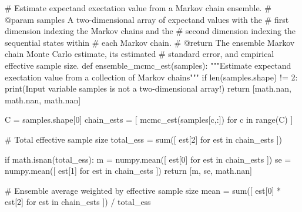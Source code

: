 \documentclass[
  letterpaper,
  DIV=11,
  numbers=noendperiod]{scrartcl}
\newenvironment{Shaded}{\begin{snugshade}}{\end{snugshade}}
\newcommand{\BuiltInTok}[1]{\textcolor[rgb]{0.00,0.23,0.31}{#1}}
\newcommand{\CommentTok}[1]{\textcolor[rgb]{0.37,0.37,0.37}{#1}}
\newcommand{\ControlFlowTok}[1]{\textcolor[rgb]{0.00,0.23,0.31}{#1}}
\newcommand{\DecValTok}[1]{\textcolor[rgb]{0.68,0.00,0.00}{#1}}
\newcommand{\KeywordTok}[1]{\textcolor[rgb]{0.00,0.23,0.31}{#1}}
\newcommand{\NormalTok}[1]{\textcolor[rgb]{0.00,0.23,0.31}{#1}}
\newcommand{\OperatorTok}[1]{\textcolor[rgb]{0.37,0.37,0.37}{#1}}
\newcommand{\StringTok}[1]{\textcolor[rgb]{0.13,0.47,0.30}{#1}}
\begin{document}
\begin{Shaded}
\begin{Highlighting}[]
\CommentTok{\# Estimate expectand exectation value from a Markov chain ensemble.}
\CommentTok{\# @param samples A two{-}dimensional array of expectand values with the}
\CommentTok{\#                first dimension indexing the Markov chains and the}
\CommentTok{\#                second dimension indexing the sequential states within}
\CommentTok{\#                each Markov chain.}
\CommentTok{\# @return The ensemble Markov chain Monte Carlo estimate, its estimated}
\CommentTok{\#         standard error, and empirical effective sample size.}
\KeywordTok{def}\NormalTok{ ensemble\_mcmc\_est(samples):}
  \CommentTok{"""Estimate expectand exectation value from a collection of }
\CommentTok{     Markov chains"""}
  \ControlFlowTok{if} \BuiltInTok{len}\NormalTok{(samples.shape) }\OperatorTok{!=} \DecValTok{2}\NormalTok{:}
    \BuiltInTok{print}\NormalTok{(}\StringTok{\textquotesingle{}Input variable \textasciigrave{}samples\textasciigrave{} is not a two{-}dimensional array!\textquotesingle{}}\NormalTok{)}
    \ControlFlowTok{return}\NormalTok{ [math.nan, math.nan, math.nan]}
    
\NormalTok{  C }\OperatorTok{=}\NormalTok{ samples.shape[}\DecValTok{0}\NormalTok{]}
\NormalTok{  chain\_ests }\OperatorTok{=}\NormalTok{ [ mcmc\_est(samples[c,:]) }\ControlFlowTok{for}\NormalTok{ c }\KeywordTok{in} \BuiltInTok{range}\NormalTok{(C) ]}
  
  \CommentTok{\# Total effective sample size}
\NormalTok{  total\_ess }\OperatorTok{=} \BuiltInTok{sum}\NormalTok{([ est[}\DecValTok{2}\NormalTok{] }\ControlFlowTok{for}\NormalTok{ est }\KeywordTok{in}\NormalTok{ chain\_ests ])}
  
  \ControlFlowTok{if}\NormalTok{ math.isnan(total\_ess):}
\NormalTok{    m  }\OperatorTok{=}\NormalTok{ numpy.mean([ est[}\DecValTok{0}\NormalTok{] }\ControlFlowTok{for}\NormalTok{ est }\KeywordTok{in}\NormalTok{ chain\_ests ])}
\NormalTok{    se }\OperatorTok{=}\NormalTok{ numpy.mean([ est[}\DecValTok{1}\NormalTok{] }\ControlFlowTok{for}\NormalTok{ est }\KeywordTok{in}\NormalTok{ chain\_ests ])}
    \ControlFlowTok{return}\NormalTok{ [m, se, math.nan]}
  
  \CommentTok{\# Ensemble average weighted by effective sample size}
\NormalTok{  mean }\OperatorTok{=} \BuiltInTok{sum}\NormalTok{([ est[}\DecValTok{0}\NormalTok{] }\OperatorTok{*}\NormalTok{ est[}\DecValTok{2}\NormalTok{] }\ControlFlowTok{for}\NormalTok{ est }\KeywordTok{in}\NormalTok{ chain\_ests ]) }\OperatorTok{/}\NormalTok{ total\_ess}
\end{Highlighting}
\end{Shaded}
\end{document}
